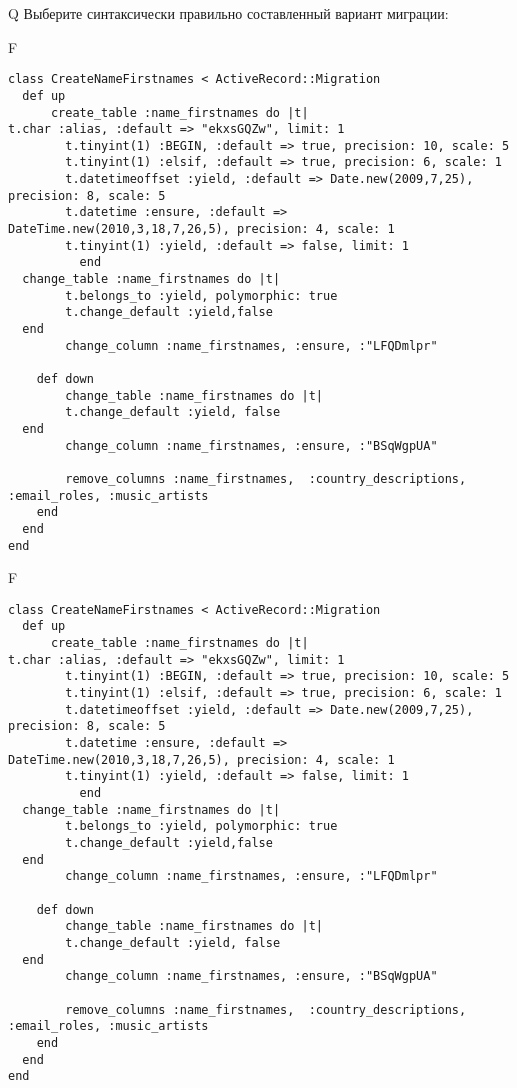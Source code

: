 Q
Выберите синтаксически правильно составленный вариант миграции:

F
\begin{verbatim}
class CreateNameFirstnames < ActiveRecord::Migration
  def up
	  create_table :name_firstnames do |t|
t.char :alias, :default => "ekxsGQZw", limit: 1
		t.tinyint(1) :BEGIN, :default => true, precision: 10, scale: 5
		t.tinyint(1) :elsif, :default => true, precision: 6, scale: 1
		t.datetimeoffset :yield, :default => Date.new(2009,7,25), precision: 8, scale: 5
		t.datetime :ensure, :default => DateTime.new(2010,3,18,7,26,5), precision: 4, scale: 1
		t.tinyint(1) :yield, :default => false, limit: 1
		  end
  change_table :name_firstnames do |t|
		t.belongs_to :yield, polymorphic: true
 		t.change_default :yield,false
  end
 		change_column :name_firstnames, :ensure, :"LFQDmlpr"
   
	def down
		change_table :name_firstnames do |t|
		t.change_default :yield, false
  end
 		change_column :name_firstnames, :ensure, :"BSqWgpUA"
   
		remove_columns :name_firstnames,  :country_descriptions, :email_roles, :music_artists 
    end 
  end
end

\end{verbatim}

F
\begin{verbatim}
class CreateNameFirstnames < ActiveRecord::Migration
  def up
	  create_table :name_firstnames do |t|
t.char :alias, :default => "ekxsGQZw", limit: 1
		t.tinyint(1) :BEGIN, :default => true, precision: 10, scale: 5
		t.tinyint(1) :elsif, :default => true, precision: 6, scale: 1
		t.datetimeoffset :yield, :default => Date.new(2009,7,25), precision: 8, scale: 5
		t.datetime :ensure, :default => DateTime.new(2010,3,18,7,26,5), precision: 4, scale: 1
		t.tinyint(1) :yield, :default => false, limit: 1
		  end
  change_table :name_firstnames do |t|
		t.belongs_to :yield, polymorphic: true
 		t.change_default :yield,false
  end
 		change_column :name_firstnames, :ensure, :"LFQDmlpr"
   
	def down
		change_table :name_firstnames do |t|
		t.change_default :yield, false
  end
 		change_column :name_firstnames, :ensure, :"BSqWgpUA"
   
		remove_columns :name_firstnames,  :country_descriptions, :email_roles, :music_artists 
    end 
  end
end

\end{verbatim}

